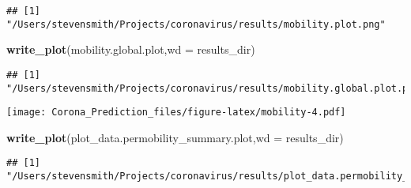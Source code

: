\documentclass[]{article}
\newenvironment{Shaded}{\begin{snugshade}}{\end{snugshade}}
\newcommand{\KeywordTok}[1]{\textcolor[rgb]{0.13,0.29,0.53}{\textbf{{#1}}}}
\newcommand{\DataTypeTok}[1]{\textcolor[rgb]{0.13,0.29,0.53}{{#1}}}
\newcommand{\DecValTok}[1]{\textcolor[rgb]{0.00,0.00,0.81}{{#1}}}
\newcommand{\StringTok}[1]{\textcolor[rgb]{0.31,0.60,0.02}{{#1}}}
\newcommand{\CommentTok}[1]{\textcolor[rgb]{0.56,0.35,0.01}{\textit{{#1}}}}
\newcommand{\NormalTok}[1]{{#1}}
\begin{document}
\begin{verbatim}
## [1] "/Users/stevensmith/Projects/coronavirus/results/mobility.plot.png"
\end{verbatim}

\begin{Shaded}
\begin{Highlighting}[]
\KeywordTok{write_plot}\NormalTok{(mobility.global.plot,}\DataTypeTok{wd =} \NormalTok{results_dir)}
\end{Highlighting}
\end{Shaded}

\begin{verbatim}
## [1] "/Users/stevensmith/Projects/coronavirus/results/mobility.global.plot.png"
\end{verbatim}

\begin{Shaded}
\end{Shaded}

\texttt{[image: Corona\_Prediction\_files/figure-latex/mobility-4.pdf]}

\begin{Shaded}
\begin{Highlighting}[]
\KeywordTok{write_plot}\NormalTok{(plot_data.permobility_summary.plot,}\DataTypeTok{wd =} \NormalTok{results_dir)}
\end{Highlighting}
\end{Shaded}

\begin{verbatim}
## [1] "/Users/stevensmith/Projects/coronavirus/results/plot_data.permobility_summary.plot.png"
\end{verbatim}
\end{document}
